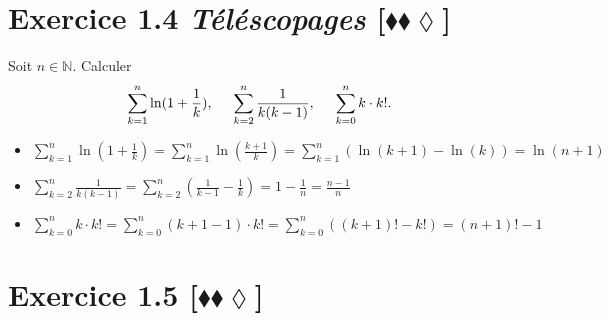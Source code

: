 \documentclass[10pt]{article}
\begin{document}

\section*{Exercice 1.4 \emph{Téléscopages} [$\blacklozenge\blacklozenge\lozenge$]}

\begin{tcolorbox}[enhanced, width=6in, center, size=fbox, fontupper=\large, drop shadow southwest]
    Soit $n\in\mathbb{N}$. Calculer
    \begin{equation*}
        \sum\limits^{n}_{k=1}{\ln(1+\frac{1}{k})}, \hspace{0.5cm} \sum\limits^{n}_{k=2}{\frac{1}{k(k-1)}}, \hspace{0.5cm} \sum\limits_{k=0}^{n}{k\cdot k!}.
    \end{equation*}
    \begin{itemize}
        \item $\sum\limits^{n}_{k=1}{\ln(1+\frac{1}{k})}=\sum\limits^n_{k=1}{\ln(\frac{k+1}{k})}=\sum\limits^n_{k=1}{(\ln(k+1)-\ln(k))}=\ln(n+1)$
        \item $\sum\limits^{n}_{k=2}{\frac{1}{k(k-1)}}=\sum\limits^n_{k=2}{(\frac{1}{k-1}-\frac{1}{k})}=1-\frac{1}{n}=\frac{n-1}{n}$
        \item $\sum\limits_{k=0}^{n}{k\cdot k!}=\sum\limits^n_{k=0}{(k+1-1)\cdot k!}=\sum\limits^n_{k=0}{((k+1)! - k!)}=(n+1)!-1$
    \end{itemize}
\end{tcolorbox}


\section*{Exercice 1.5 [$\blacklozenge\blacklozenge\lozenge$]}
\end{document}

